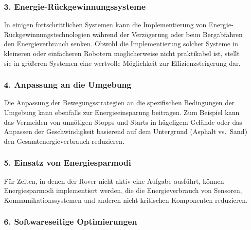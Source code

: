 \documentclass{vorlage-design-main}
\begin{document}
\hypertarget{energie-ruxfcckgewinnungssysteme}{%
\subsubsection{\texorpdfstring{3.
\textbf{Energie-Rückgewinnungssysteme}}{3. Energie-Rückgewinnungssysteme}}\label{energie-rueckgewinnungssysteme}}

In einigen fortschrittlichen Systemen kann die Implementierung von
Energie-Rückgewinnungstechnologien während der Verzögerung oder beim
Bergabfahren den Energieverbrauch senken. Obwohl die Implementierung
solcher Systeme in kleineren oder einfacheren Robotern möglicherweise
nicht praktikabel ist, stellt sie in größeren Systemen eine wertvolle
Möglichkeit zur Effizienzsteigerung dar.

\hypertarget{anpassung-an-die-umgebung}{%
\subsubsection{\texorpdfstring{4. \textbf{Anpassung an die
Umgebung}}{4. Anpassung an die Umgebung}}\label{anpassung-an-die-umgebung}}

Die Anpassung der Bewegungsstrategien an die spezifischen Bedingungen
der Umgebung kann ebenfalls zur Energieeinsparung beitragen. Zum
Beispiel kann das Vermeiden von unnötigen Stopps und Starts in hügeligem
Gelände oder das Anpassen der Geschwindigkeit basierend auf dem
Untergrund (Asphalt vs.~Sand) den Gesamtenergieverbrauch reduzieren.

\hypertarget{einsatz-von-energiesparmodi}{%
\subsubsection{\texorpdfstring{5. \textbf{Einsatz von
Energiesparmodi}}{5. Einsatz von Energiesparmodi}}\label{einsatz-von-energiesparmodi}}

Für Zeiten, in denen der Rover nicht aktiv eine Aufgabe ausführt, können
Energiesparmodi implementiert werden, die die Energieverbrauch von
Sensoren, Kommunikationssystemen und anderen nicht kritischen
Komponenten reduzieren.

\hypertarget{softwareseitige-optimierungen}{%
\subsubsection{\texorpdfstring{6. \textbf{Softwareseitige
Optimierungen}}{6. Softwareseitige Optimierungen}}\label{softwareseitige-optimierungen}}
\end{document}
